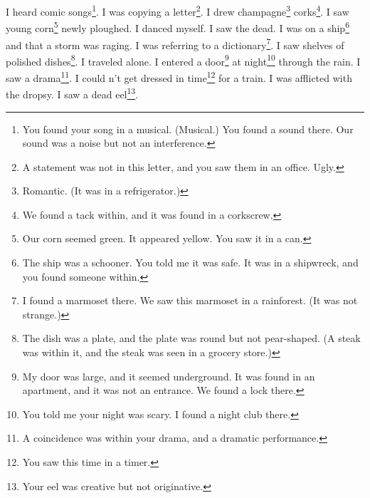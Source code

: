 \documentclass[12pt]{book}
\begin{document}
 I heard comic songs\footnote{You found your song in a musical. (Musical.) You found a sound there. Our sound was a noise but not an interference.}. I was copying a letter\footnote{A statement was not in this letter, and you saw them in an office. Ugly.}. I drew champagne\footnote{Romantic. (It was in a refrigerator.)} corks\footnote{We found a tack within, and it was found in a corkscrew.}. I saw young corn\footnote{Our corn seemed green. It appeared yellow. You saw it in a can.} newly ploughed. I danced myself. I saw the dead. I was on a ship\footnote{The ship was a schooner. You told me it was safe. It was in a shipwreck, and you found someone within.} and that a storm was raging. I was referring to a dictionary\footnote{I found a marmoset there. We saw this marmoset in a rainforest. (It was not strange.)}. I saw shelves of polished dishes\footnote{The dish was a plate, and the plate was round but not pear-shaped. (A steak was within it, and the steak was seen in a grocery store.)}. I traveled alone. I entered a door\footnote{My door was large, and it seemed underground. It was found in an apartment, and it was not an entrance. We found a lock there.} at night\footnote{You told me your night was scary. I found a night club there.} through the rain. I saw a drama\footnote{A coincidence was within your drama, and a dramatic performance.}. I could n't get dressed in time\footnote{You saw this time in a timer.} for a train. I was afflicted with the dropsy. I saw a dead eel\footnote{Your eel was creative but not originative.}. 
\end{document}
